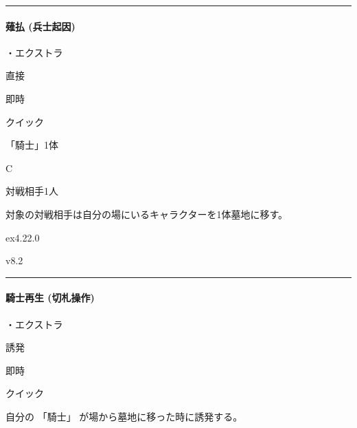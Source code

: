 \documentclass[letterpaper,10pt,dvipdfmx]{sphinxmanual}
\begin{document}
\bigskip\hrule\bigskip



\paragraph{薙払 (兵士起因)}
\label{\detokenize{auto/frameActionlist:act-knightsweep}}\label{\detokenize{auto/frameActionlist:id83}}
\sphinxAtStartPar
{}

\sphinxAtStartPar
・エクストラ

\sphinxAtStartPar
{} 直接

\sphinxAtStartPar
{} 即時

\sphinxAtStartPar
{} クイック

\sphinxAtStartPar
{} 「騎士」1体

\sphinxAtStartPar
{} C

\sphinxAtStartPar
{}

\sphinxAtStartPar
対戦相手1人

\sphinxAtStartPar
{}

\sphinxAtStartPar
対象の対戦相手は自分の場にいるキャラクターを1体墓地に移す。

\sphinxAtStartPar
{}  ex4.22.0

\sphinxAtStartPar
{}  v8.2


\bigskip\hrule\bigskip



\paragraph{騎士再生 (切札操作)}
\label{\detokenize{auto/frameActionlist:act-knightrevive}}\label{\detokenize{auto/frameActionlist:id84}}
\sphinxAtStartPar
{}

\sphinxAtStartPar
・エクストラ

\sphinxAtStartPar
{} 誘発

\sphinxAtStartPar
{} 即時

\sphinxAtStartPar
{} クイック

\sphinxAtStartPar
{}

\sphinxAtStartPar
自分の 「騎士」 が場から墓地に移った時に誘発する。
\end{document}
